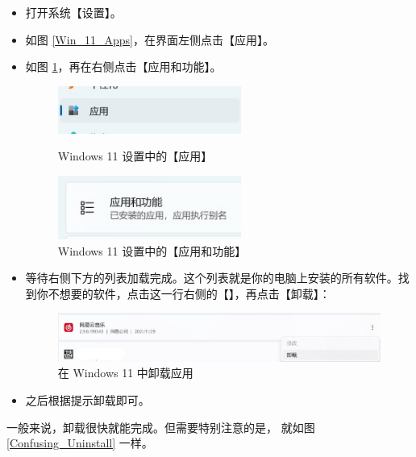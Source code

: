 \begin{itemize}
  \item 打开系统【设置】。
  \item 如图 \ref{Win_11_Apps}，在界面左侧点击【应用】。
  \item 如图 \ref{Win_11_Apps_and_Functions}，再在右侧点击【应用和功能】。
    \begin{figure}[htb!]
      \centering
      \begin{minipage}{6.5cm}
        \centering
        \includegraphics[width=6cm]{assets/Win_11_Apps.jpg}
        \caption{Windows 11 设置中的【应用】}
        \label{Win_11_Apps}
      \end{minipage}
      \quad
      \begin{minipage}{7cm}
        \centering
        \includegraphics[width=6cm]{assets/Win_11_Apps_and_Functions.jpg}
        \caption{Windows 11 设置中的【应用和功能】}
        \label{Win_11_Apps_and_Functions}
      \end{minipage}
    \end{figure}
  \item 等待右侧下方的列表加载完成。这个列表就是你的电脑上安装的所有软件。找到你不想要的软件，点击这一行右侧的【】，再点击【卸载】：
    \begin{figure}[htb!]
      \centering
      \includegraphics[width=13cm]{assets/Win_11_Unistall.jpg}
      \caption{在 Windows 11 中卸载应用}
      \label{Win_11_Unistall}
    \end{figure}
  \item 之后根据提示卸载即可。
\end{itemize}

一般来说，卸载很快就能完成。但需要特别注意的是，
就如图 \ref{Confusing_Uninstall} 一样。

